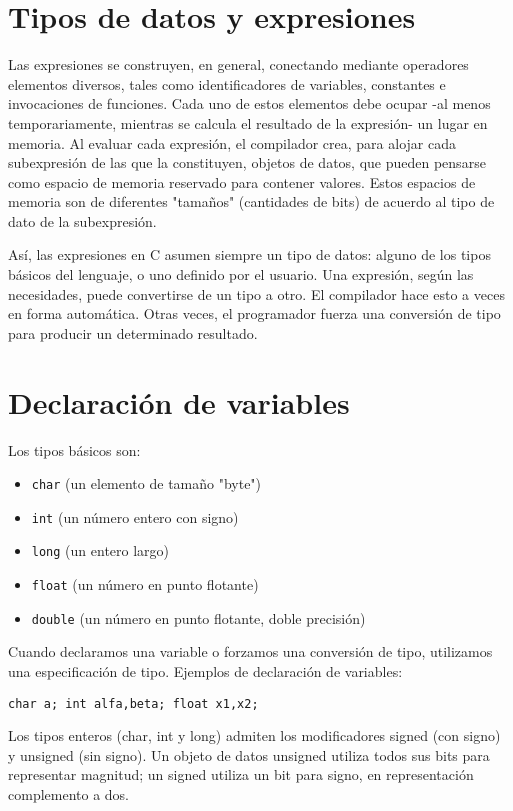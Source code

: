 
\section{Tipos de datos y expresiones}

Las expresiones se construyen, en general, conectando mediante operadores elementos diversos, tales
como identificadores de variables, constantes e invocaciones de funciones. Cada uno de estos
elementos debe ocupar -al menos temporariamente, mientras se calcula el resultado de la expresión- un
lugar en memoria. Al evaluar cada expresión, el compilador crea, para alojar cada subexpresión de las
que la constituyen, objetos de datos, que pueden pensarse como espacio de memoria reservado para
contener valores. Estos espacios de memoria son de diferentes "tamaños" (cantidades de bits) de
acuerdo al tipo de dato de la subexpresión.

Así, las expresiones en C asumen siempre un tipo de datos: alguno de los tipos básicos del lenguaje, o
uno definido por el usuario. Una expresión, según las necesidades, puede convertirse de un tipo a otro.
El compilador hace esto a veces en forma automática. Otras veces, el programador fuerza una
conversión de tipo para producir un determinado resultado.

\section{Declaración de variables}

Los tipos básicos son:
\begin{itemize}
	\item \texttt{char} (un elemento de tamaño "byte")
	\item \texttt{int} (un número entero con signo)
	\item \texttt{long} (un entero largo)
	\item \texttt{float} (un número en punto flotante)
	\item \texttt{double} (un número en punto flotante, doble precisión)
\end{itemize}

Cuando declaramos una variable o forzamos una conversión de tipo, utilizamos una especificación de
tipo. Ejemplos de declaración de variables:

\texttt{char a;
int alfa,beta;
float x1,x2;}

Los tipos enteros (char, int y long) admiten los modificadores signed (con signo) y unsigned (sin
signo). Un objeto de datos unsigned utiliza todos sus bits para representar magnitud; un signed utiliza
un bit para signo, en representación complemento a dos.

